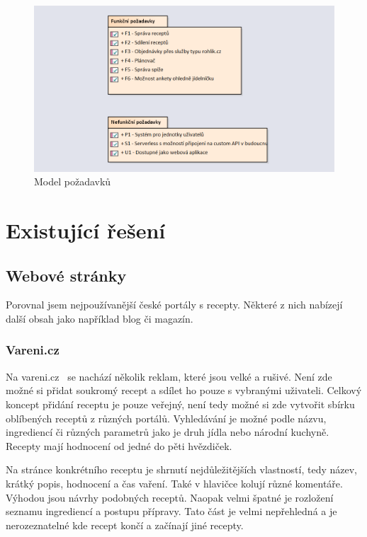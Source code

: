 \begin{figure}[H]
    \includegraphics[width=\textwidth]{images/pozadavky}
    \caption{Model požadavků} \label{picture:recipeo:pozadavky}
\end{figure}

\section{Existující řešení}

\subsection{Webové stránky}

Porovnal jsem nejpoužívanější české portály s recepty. Některé z nich nabízejí další obsah jako například blog či magazín.

\subsubsection{Vareni.cz}

Na vareni.cz~\cite{VareniCZ} se nachází několik reklam, které jsou velké a rušivé. Není zde možné si přidat soukromý recept a sdílet ho
pouze s vybranými uživateli. Celkový koncept přidání receptu je pouze veřejný, není tedy možné si zde vytvořit sbírku
oblíbených receptů z různých portálů. Vyhledávání je možné podle názvu, ingrediencí či různých parametrů jako je druh jídla
nebo národní kuchyně. Recepty mají hodnocení od jedné do pěti hvězdiček.

Na stránce konkrétního receptu je shrnutí nejdůležitějších vlastností, tedy název, krátký popis, hodnocení a čas vaření.
Také v hlavičce kolují různé komentáře. Výhodou jsou návrhy podobných receptů. Naopak velmi špatné je rozložení seznamu ingrediencí
a postupu přípravy. Tato část je velmi nepřehledná a je nerozeznatelné kde recept končí a začínají jiné recepty.

